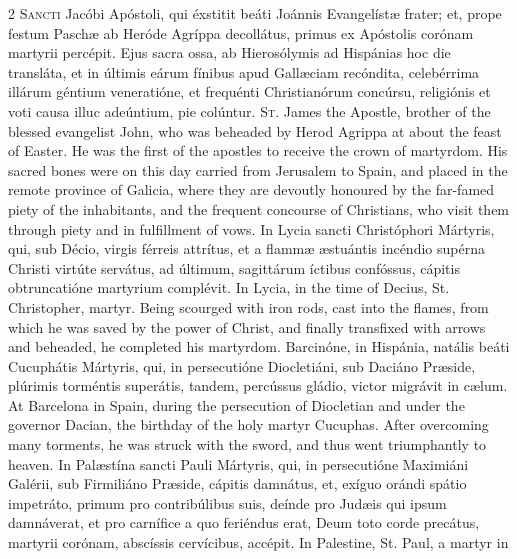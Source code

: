 \begin{paracol}{2}
\lettrine[lines=2]{S}{ancti} Jacóbi Apóstoli, 
 qui éxstitit beáti Joánnis Evangelístæ frater; et, prope festum Paschæ ab 
 Heróde Agríppa decollátus, primus ex Apóstolis corónam martyrii percépit. 
 Ejus sacra ossa, ab Hierosólymis ad Hispánias hoc die transláta, et in 
 últimis eárum fínibus apud Gallæciam recóndita, celebérrima illárum géntium 
 veneratióne, et frequénti Christianórum concúrsu, religiónis et voti causa 
 illuc adeúntium, pie colúntur.
\switchcolumn
{}
\lettrine[lines=2]{S}{t.} James the Apostle, brother of 
 the blessed evangelist John, who was beheaded by Herod Agrippa at about the 
 feast of Easter. He was the first of the apostles to receive the crown 
 of martyrdom. His sacred bones were on this day carried from Jerusalem 
 to Spain, and placed in the remote province of Galicia, where they are 
 devoutly honoured by the far-famed piety of the inhabitants, and the 
 frequent concourse of Christians, who visit them through piety and in fulfillment of vows.
\switchcolumn*
{}
In Lycia sancti 
 Christóphori Mártyris, qui, sub Décio, virgis férreis attrítus, et a flammæ 
 æstuántis incéndio supérna Christi virtúte servátus, ad últimum, sagittárum 
 íctibus confóssus, cápitis obtruncatióne martyrium complévit.
\switchcolumn
{}
In Lycia, in the time of Decius, St. 
 Christopher, martyr. Being scourged with iron rods, cast into the 
 flames, from which he was saved by the power of Christ, and finally 
 transfixed with arrows and beheaded, he completed his martyrdom.
\switchcolumn*
{}
Barcinóne, in Hispánia, 
 natális beáti Cucuphátis Mártyris, qui, in persecutióne Diocletiáni, sub 
 Daciáno Præside, plúrimis torméntis superátis, tandem, percússus gládio, 
 victor migrávit in cælum.
\switchcolumn
{}
At Barcelona in Spain, during the 
 persecution of Diocletian and under the governor Dacian, the birthday of the 
 holy martyr Cucuphas. After overcoming many torments, he was struck 
 with the sword, and thus went triumphantly to heaven.
\switchcolumn*
{}
In Palæstína sancti 
 Pauli Mártyris, qui, in persecutióne Maximiáni Galérii, sub Firmiliáno 
 Præside, cápitis damnátus, et, exíguo orándi spátio impetráto, primum pro 
 contribúlibus suis, deínde pro Judæis qui ipsum damnáverat, et pro carnífice 
 a quo feriéndus erat, Deum toto corde precátus, martyrii corónam, abscíssis 
 cervícibus, accépit.
\switchcolumn
{}
In Palestine, St. Paul, a martyr in 

\end{paracol}
